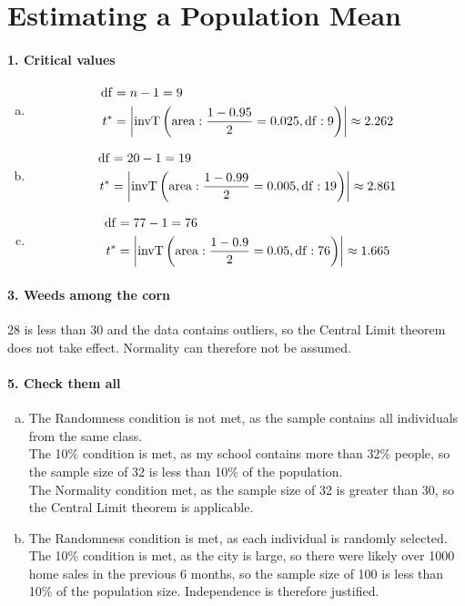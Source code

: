 \documentclass[../Homework]{subfiles}
\begin{document}
	\section{Estimating a Population Mean}
		\paragraph{1. Critical values}
			\begin{enumerate}[a.]
				\item
					\begin{align*}
						\operatorname{df} &= n - 1 = 9 \\
						t^* &= \left|\operatorname{invT}\left(\operatorname{area}: \frac{1 - 0.95}{2} = 0.025, \operatorname{df}: 9\right)\right| \approx 2.262
					\end{align*}
				\item
					\begin{align*}
						\operatorname{df} &= 20 - 1 = 19 \\
						t^* &= \left|\operatorname{invT}\left(\operatorname{area}: \frac{1 - 0.99}{2} = 0.005, \operatorname{df}: 19\right)\right| \approx 2.861
					\end{align*}
				\item
					\begin{align*}
						\operatorname{df} &= 77 - 1 = 76 \\
						t^* &= \left|\operatorname{invT}\left(\operatorname{area}: \frac{1 - 0.9}{2} = 0.05, \operatorname{df}: 76\right)\right| \approx 1.665
					\end{align*}
			\end{enumerate}
		\paragraph{3. Weeds among the corn}
			28 is less than 30 and the data contains outliers, so the Central Limit theorem does not take effect. Normality can therefore not be assumed.
		\paragraph{5. Check them all}
			\begin{enumerate}[a.]
				\item
					The Randomness condition is not met, as the sample contains all individuals from the same class. \\
					The 10\% condition is met, as my school contains more than 32\% people, so the sample size of 32 is less than 10\% of the population. \\
					The Normality condition met, as the sample size of 32 is greater than 30, so the Central Limit theorem is applicable.
				\item
					The Randomness condition is met, as each individual is randomly selected. \\
					The 10\% condition is met, as the city is large, so there were likely over 1000 home sales in the previous 6 months, so the sample size of 100 is less than 10\% of the population size. Independence is therefore justified. \\
			\end{enumerate}
\end{document}
